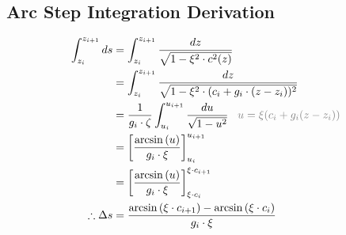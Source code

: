 \documentclass{article}
\begin{document}
\subsection{Arc Step Integration Derivation}
\begin{align*}
	\int_{z_i}^{z_{i+1}}ds & = \int_{z_i}^{z_{i+1}}\frac{dz}{\sqrt{1-\xi^2\cdot c^2(z)}}                                                       \\
	                       & = \int_{z_i}^{z_{i+1}}\frac{dz}{\sqrt{1-\xi^2\cdot (c_i + g_i\cdot(z - z_i))^2}}                                  \\
	                       & = \frac{1}{g_i\cdot\zeta}\int_{u_i}^{u_{i+1}}\frac{du}{\sqrt{1-u^2}}\textcolor{gray}{\;\;\;u=\xi(c_i+g_i(z-z_i))} \\
	                       & = \left[\frac{\arcsin{(u)}}{g_i\cdot\xi}\right]_{u_i}^{u_{i+1}}                                                   \\
	                       & = \left[\frac{\arcsin{(u)}}{g_i\cdot\xi}\right]_{\xi\cdot c_i}^{\xi\cdot c_{i+1}}                                 \\
	\therefore \Delta s    & = \frac{\arcsin{(\xi\cdot c_{i+1})} - \arcsin{(\xi\cdot c_i)}}{g_i\cdot\xi}                                       \\
\end{align*}
\end{document}
